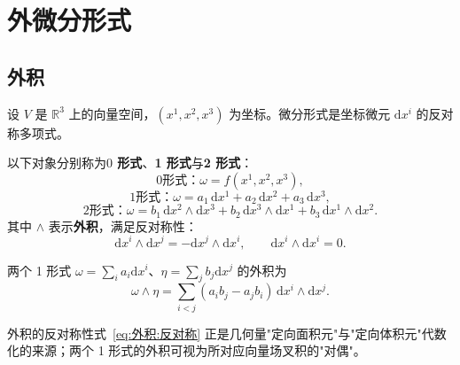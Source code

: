 
\section{外微分形式}

\subsection{外积}

设 $V$ 是 $\mathbb{R}^3$ 上的向量空间，$(x^1,x^2,x^3)$ 为坐标。微分形式是坐标微元 $\mathrm{d}x^i$ 的反对称多项式。

\begin{definition}[微分形式]
	以下对象分别称为\textbf{$0$ 形式}、\textbf{1 形式}与\textbf{2 形式}：
	\begin{equation}
		0\text{形式：}\omega=f(x^1,x^2,x^3),
		\label{eq:外微分:0形式}
	\end{equation}
	\begin{equation}
		1\text{形式：}\omega=a_1\,\mathrm{d}x^{1}+a_2\,\mathrm{d}x^{2}+a_3\,\mathrm{d}x^{3},
		\label{eq:外微分:1形式}
	\end{equation}
	\begin{equation}
		2\text{形式：}\omega=b_1\,\mathrm{d}x^{2}\wedge\mathrm{d}x^{3}
		+b_2\,\mathrm{d}x^{3}\wedge\mathrm{d}x^{1}
		+b_3\,\mathrm{d}x^{1}\wedge\mathrm{d}x^{2}.
		\label{eq:外微分:2形式}
	\end{equation}
	其中 $\wedge$ 表示\textbf{外积}，满足反对称性：
	\begin{equation}
		\mathrm{d}x^{i}\wedge\mathrm{d}x^{j}=-\mathrm{d}x^{j}\wedge\mathrm{d}x^{i},
		\qquad
		\mathrm{d}x^{i}\wedge\mathrm{d}x^{i}=0.
		\label{eq:外积:反对称}
	\end{equation}
\end{definition}

两个 1 形式 $\omega=\sum_i a_i\mathrm{d}x^{i}$、$\eta=\sum_j b_j\mathrm{d}x^{j}$ 的外积为
\begin{equation}
	\omega\wedge\eta=\sum_{i<j}(a_ib_j-a_jb_i)\,\mathrm{d}x^{i}\wedge\mathrm{d}x^{j}.
	\label{eq:外积:计算公式}
\end{equation}

\begin{remark}
	外积的反对称性式~\eqref{eq:外积:反对称} 正是几何量"定向面积元"与"定向体积元"代数化的来源；两个 1 形式的外积可视为所对应向量场叉积的"对偶"。
\end{remark}

